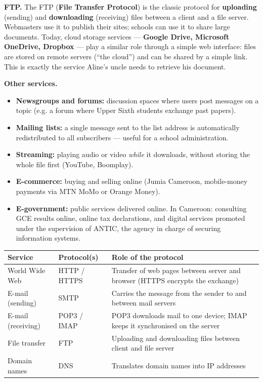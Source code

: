 \documentclass[11pt]{article}
\newcommand{\cle}[1]{{\popxbold\color{popdark}#1}}
\begin{document}
\textbf{FTP.} The \cle{FTP} (\textbf{File Transfer Protocol}) is the classic protocol for \textbf{uploading} (sending) and \textbf{downloading} (receiving) files between a client and a file server. Webmasters use it to publish their sites; schools can use it to share large documents. Today, \cle{cloud storage} services — \textbf{Google Drive, Microsoft OneDrive, Dropbox} — play a similar role through a simple web interface: files are stored on remote servers (``the cloud'') and can be shared by a simple link. This is exactly the service Aline's uncle needs to retrieve his document.

\textbf{Other services.}
\begin{itemize}
\item \textbf{Newsgroups and forums:} discussion spaces where users post messages on a topic (e.g. a forum where Upper Sixth students exchange past papers).
\item \textbf{Mailing lists:} a single message sent to the list address is automatically redistributed to all subscribers — useful for a school administration.
\item \textbf{Streaming:} playing audio or video \emph{while} it downloads, without storing the whole file first (YouTube, Boomplay).
\item \textbf{E-commerce:} buying and selling online (Jumia Cameroon, mobile-money payments via MTN MoMo or Orange Money).
\item \textbf{E-government:} public services delivered online. In Cameroon: consulting GCE results online, online tax declarations, and digital services promoted under the supervision of ANTIC, the agency in charge of securing information systems.
\end{itemize}

\begin{center}
\begin{tabularx}{\linewidth}{|l|l|X|}
\hline
\rowcolor{popblueL} \textbf{Service} & \textbf{Protocol(s)} & \textbf{Role of the protocol} \\
\hline
World Wide Web & HTTP / HTTPS & Transfer of web pages between server and browser (HTTPS encrypts the exchange) \\
\hline
E-mail (sending) & SMTP & Carries the message from the sender to and between mail servers \\
\hline
E-mail (receiving) & POP3 / IMAP & POP3 downloads mail to one device; IMAP keeps it synchronised on the server \\
\hline
File transfer & FTP & Uploading and downloading files between client and file server \\
\hline
Domain names & DNS & Translates domain names into IP addresses \\
\hline
\end{tabularx}
\end{center}
\end{document}
